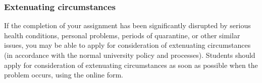 \documentclass[12pt]{article}
\begin{document}
 \subsubsection*{Extenuating circumstances}

If the completion of your assignment has been significantly disrupted
by serious health conditions, personal problems, periods of
quarantine, or other similar issues, you may be able to apply for
consideration of extenuating circumstances (in accordance with the
normal university policy and processes). Students should apply for
consideration of extenuating circumstances as soon as possible when
the problem occurs, using the online form.
\end{document}
